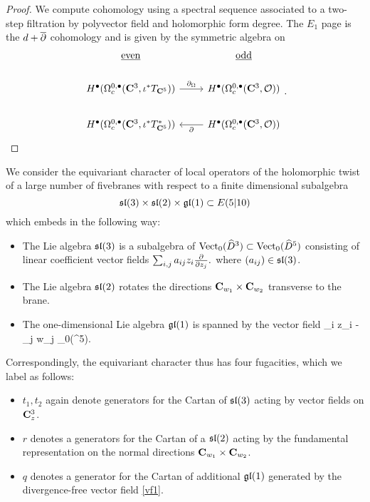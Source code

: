 \begin{proof}
  We compute cohomology using a spectral sequence associated to a two-step filtration by polyvector field and holomorphic form degree. The $E_{1}$ page is the $d+\overline{\partial}$ cohomology and is given by the symmetric algebra on

  \[
\begin{tikzcd}
\ul{\rm even} & \ul{\rm odd} \\
H^{\bullet}(\Omega^{0,\bullet}_{c} (\C^{3}, \iota^{*}T_{\C^{5}})) \ar[r, "\del_{\Omega}"] & H^{\bullet}(\Omega^{0,\bullet}_{c} (\C^{3}, \cO) )\\
H^{\bullet}(\Omega^{0,\bullet}_{c} (\C^{3},  \iota^{*}T^{*}_{\C^{5}}))& H^{\bullet}(\Omega^{0,\bullet}_{c} (\C^{3}, \cO)) \ar[l, "\del"]
\end{tikzcd}
.\]


\end{proof}

\parsec

We consider the equivariant character of local operators of the holomorphic twist of a large number of fivebranes with respect to a finite dimensional subalgebra 
\[
\mathfrak{sl}(3)\times \mathfrak{sl}(2)\times \mathfrak{gl}(1)\subset E(5|10)
\]
which embeds in the following way:
\begin{itemize}
\item The Lie algebra $\mathfrak{sl}(3)$ is a subalgebra of $\operatorname{Vect}_0(\widehat{D}^3) \subset \operatorname{Vect}_0 (\widehat{D}^5)$ consisting of linear coefficient vector fields $\sum_{i,j} a_{ij} z_i \frac{\partial}{\partial z_j}.$
where $(a_{ij}) \in \mathfrak{sl}(3)$. 
\item The Lie algebra $\mathfrak{sl}(2)$ rotates the directions $\mathbf{C}_{w_1} \times \mathbf{C}_{w_2}$ transverse to the brane.
\item The one-dimensional Lie algebra $\mathfrak{gl}(1)$ is spanned by the vector field 
\beqn\label{vf1}
\sum_i z_i  -  \sum_{j} w_j  \in \Vect_0(^5).
\eeqn
\end{itemize}

Correspondingly, the equivariant character thus has four fugacities, which we label as follows:
\begin{itemize}
  \item $t_{1}, t_{2}$ again denote generators for the Cartan of $\mathfrak{sl}(3)$ acting by vector fields on $\mathbf{C}^{3}_{z}$.
  \item $r$ denotes a generators for the Cartan of a $\mathfrak{sl}(2)$ acting by the fundamental representation on the normal directions $\mathbf{C}_{w_1} \times \mathbf{C}_{w_2}$.
  \item $q$ denotes a generator for the Cartan of additional $\mathfrak{gl}(1)$ generated by the divergence-free vector field \eqref{vf1}. 
\end{itemize}

